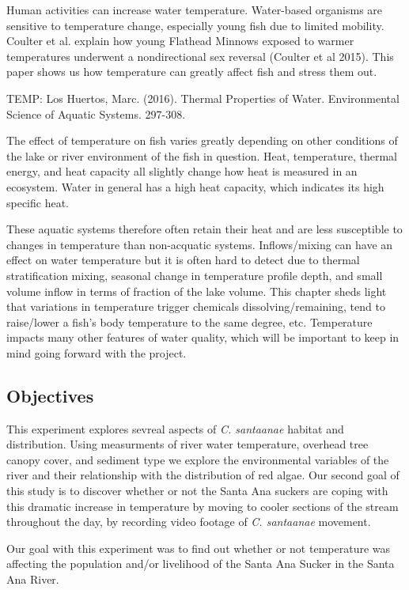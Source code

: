 \documentclass{article}\usepackage[]{graphicx}\usepackage[]{color}
\begin{document}
Human activities can increase water temperature. Water-based organisms are sensitive to temperature change, especially young fish due to limited mobility. Coulter et al. explain how young Flathead Minnows exposed to warmer temperatures underwent a nondirectional sex reversal (Coulter et al 2015). This paper shows us how temperature can greatly affect fish and stress them out. 

TEMP:
Los Huertos, Marc. (2016). Thermal Properties of Water. Environmental Science of Aquatic Systems. 297-308.

The effect of temperature on fish varies greatly depending on other conditions of the lake or river environment of the fish in question.
Heat, temperature, thermal energy, and heat capacity all slightly change how heat is measured in an ecosystem. Water in general has a high heat capacity, which indicates its high specific heat. 

These aquatic systems therefore often retain their heat and are less susceptible to changes in temperature than non-acquatic systems. Inflows/mixing can have an effect on water temperature but it is often hard to detect due to thermal stratification mixing, seasonal change in temperature profile depth, and small volume inflow in terms of fraction of the lake volume. This chapter sheds light that variations in temperature trigger chemicals dissolving/remaining, tend to raise/lower a fish's body temperature to the same degree, etc. Temperature impacts many other features of water quality, which will be important to keep in mind going forward with the project.


\subsection{Objectives}
This experiment explores sevreal aspects of \emph{C. santaanae} habitat and distribution. Using measurments of river water temperature, overhead tree canopy cover, and sediment type we explore the environmental variables of the river and their relationship with the distribution of red algae. Our second goal of this study is to discover whether or not the Santa Ana suckers are coping with this dramatic increase in temperature by moving to cooler sections of the stream throughout the day, by recording video footage of \emph{C. santaanae} movement. 

Our goal with this experiment was to find out whether or not temperature was affecting the population and/or livelihood of the Santa Ana Sucker in the Santa Ana River.
\end{document}
